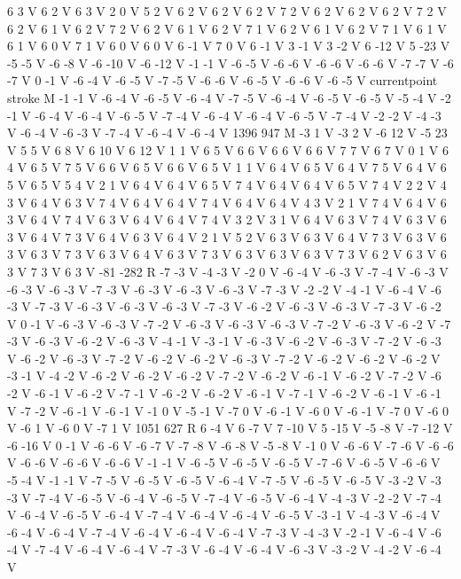 {6 3 V
6 2 V
6 3 V
2 0 V
5 2 V
6 2 V
6 2 V
6 2 V
7 2 V
6 2 V
6 2 V
6 2 V
7 2 V
6 2 V
6 1 V
6 2 V
7 2 V
6 2 V
6 1 V
6 2 V
7 1 V
6 2 V
6 1 V
6 2 V
7 1 V
6 1 V
6 1 V
6 0 V
7 1 V
6 0 V
6 0 V
6 -1 V
7 0 V
6 -1 V
3 -1 V
3 -2 V
6 -12 V
5 -23 V
-5 -5 V
-6 -8 V
-6 -10 V
-6 -12 V
-1 -1 V
-6 -5 V
-6 -6 V
-6 -6 V
-6 -6 V
-7 -7 V
-6 -7 V
0 -1 V
-6 -4 V
-6 -5 V
-7 -5 V
-6 -6 V
-6 -5 V
-6 -6 V
-6 -5 V
currentpoint stroke M
-1 -1 V
-6 -4 V
-6 -5 V
-6 -4 V
-7 -5 V
-6 -4 V
-6 -5 V
-6 -5 V
-5 -4 V
-2 -1 V
-6 -4 V
-6 -4 V
-6 -5 V
-7 -4 V
-6 -4 V
-6 -4 V
-6 -5 V
-7 -4 V
-2 -2 V
-4 -3 V
-6 -4 V
-6 -3 V
-7 -4 V
-6 -4 V
-6 -4 V
1396 947 M
-3 1 V
-3 2 V
-6 12 V
-5 23 V
5 5 V
6 8 V
6 10 V
6 12 V
1 1 V
6 5 V
6 6 V
6 6 V
6 6 V
7 7 V
6 7 V
0 1 V
6 4 V
6 5 V
7 5 V
6 6 V
6 5 V
6 6 V
6 5 V
1 1 V
6 4 V
6 5 V
6 4 V
7 5 V
6 4 V
6 5 V
6 5 V
5 4 V
2 1 V
6 4 V
6 4 V
6 5 V
7 4 V
6 4 V
6 4 V
6 5 V
7 4 V
2 2 V
4 3 V
6 4 V
6 3 V
7 4 V
6 4 V
6 4 V
7 4 V
6 4 V
6 4 V
4 3 V
2 1 V
7 4 V
6 4 V
6 3 V
6 4 V
7 4 V
6 3 V
6 4 V
6 4 V
7 4 V
3 2 V
3 1 V
6 4 V
6 3 V
7 4 V
6 3 V
6 3 V
6 4 V
7 3 V
6 4 V
6 3 V
6 4 V
2 1 V
5 2 V
6 3 V
6 3 V
6 4 V
7 3 V
6 3 V
6 3 V
6 3 V
7 3 V
6 3 V
6 4 V
6 3 V
7 3 V
6 3 V
6 3 V
6 3 V
7 3 V
6 2 V
6 3 V
6 3 V
7 3 V
6 3 V
-81 -282 R
-7 -3 V
-4 -3 V
-2 0 V
-6 -4 V
-6 -3 V
-7 -4 V
-6 -3 V
-6 -3 V
-6 -3 V
-7 -3 V
-6 -3 V
-6 -3 V
-6 -3 V
-7 -3 V
-2 -2 V
-4 -1 V
-6 -4 V
-6 -3 V
-7 -3 V
-6 -3 V
-6 -3 V
-6 -3 V
-7 -3 V
-6 -2 V
-6 -3 V
-6 -3 V
-7 -3 V
-6 -2 V
0 -1 V
-6 -3 V
-6 -3 V
-7 -2 V
-6 -3 V
-6 -3 V
-6 -3 V
-7 -2 V
-6 -3 V
-6 -2 V
-7 -3 V
-6 -3 V
-6 -2 V
-6 -3 V
-4 -1 V
-3 -1 V
-6 -3 V
-6 -2 V
-6 -3 V
-7 -2 V
-6 -3 V
-6 -2 V
-6 -3 V
-7 -2 V
-6 -2 V
-6 -2 V
-6 -3 V
-7 -2 V
-6 -2 V
-6 -2 V
-6 -2 V
-3 -1 V
-4 -2 V
-6 -2 V
-6 -2 V
-6 -2 V
-7 -2 V
-6 -2 V
-6 -1 V
-6 -2 V
-7 -2 V
-6 -2 V
-6 -1 V
-6 -2 V
-7 -1 V
-6 -2 V
-6 -2 V
-6 -1 V
-7 -1 V
-6 -2 V
-6 -1 V
-6 -1 V
-7 -2 V
-6 -1 V
-6 -1 V
-1 0 V
-5 -1 V
-7 0 V
-6 -1 V
-6 0 V
-6 -1 V
-7 0 V
-6 0 V
-6 1 V
-6 0 V
-7 1 V
1051 627 R
6 -4 V
6 -7 V
7 -10 V
5 -15 V
-5 -8 V
-7 -12 V
-6 -16 V
0 -1 V
-6 -6 V
-6 -7 V
-7 -8 V
-6 -8 V
-5 -8 V
-1 0 V
-6 -6 V
-7 -6 V
-6 -6 V
-6 -6 V
-6 -6 V
-6 -6 V
-1 -1 V
-6 -5 V
-6 -5 V
-6 -5 V
-7 -6 V
-6 -5 V
-6 -6 V
-5 -4 V
-1 -1 V
-7 -5 V
-6 -5 V
-6 -5 V
-6 -4 V
-7 -5 V
-6 -5 V
-6 -5 V
-3 -2 V
-3 -3 V
-7 -4 V
-6 -5 V
-6 -4 V
-6 -5 V
-7 -4 V
-6 -5 V
-6 -4 V
-4 -3 V
-2 -2 V
-7 -4 V
-6 -4 V
-6 -5 V
-6 -4 V
-7 -4 V
-6 -4 V
-6 -4 V
-6 -5 V
-3 -1 V
-4 -3 V
-6 -4 V
-6 -4 V
-6 -4 V
-7 -4 V
-6 -4 V
-6 -4 V
-6 -4 V
-7 -3 V
-4 -3 V
-2 -1 V
-6 -4 V
-6 -4 V
-7 -4 V
-6 -4 V
-6 -4 V
-7 -3 V
-6 -4 V
-6 -4 V
-6 -3 V
-3 -2 V
-4 -2 V
-6 -4 V
}
